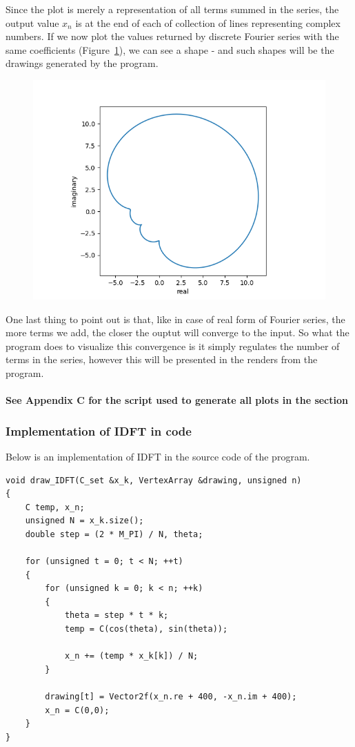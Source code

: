 \documentclass[titlepage]{article}
\begin{document}
    Since the plot is merely a representation of all terms summed in the series,
    the output value $x_n$ is at the end of each of collection of lines representing
    complex numbers. If we now plot the values returned by discrete Fourier 
    series with the same coefficients (Figure~\ref{fig:dfs_explainer_4}), we can 
    see a shape - and such shapes will be the drawings generated by the 
    program.
    \begin{figure}[H]
        \caption{}
        \centering
        \includegraphics[width=0.5\linewidth]{dfs_explainer_4}
        \label{fig:dfs_explainer_4}
    \end{figure}
    One last thing to point out is that, like in case of real form of Fourier
    series, the more terms we add, the closer the ouptut will converge to the 
    input. So what the program does to visualize this convergence is it simply
    regulates the number of terms in the series, however this will be presented
    in the renders from the program.
    \paragraph{See Appendix C for the script used to generate all plots in the 
    section}

\subsubsection{Implementation of IDFT in code}

    Below is an implementation of IDFT in the source code of the program.
    \begin{verbatim}
void draw_IDFT(C_set &x_k, VertexArray &drawing, unsigned n)
{
    C temp, x_n;
    unsigned N = x_k.size();
    double step = (2 * M_PI) / N, theta;

    for (unsigned t = 0; t < N; ++t)
    {
        for (unsigned k = 0; k < n; ++k)
        {
            theta = step * t * k;     
            temp = C(cos(theta), sin(theta));

            x_n += (temp * x_k[k]) / N;
        }

        drawing[t] = Vector2f(x_n.re + 400, -x_n.im + 400);
        x_n = C(0,0);
    }
}
    \end{verbatim}
\end{document}
